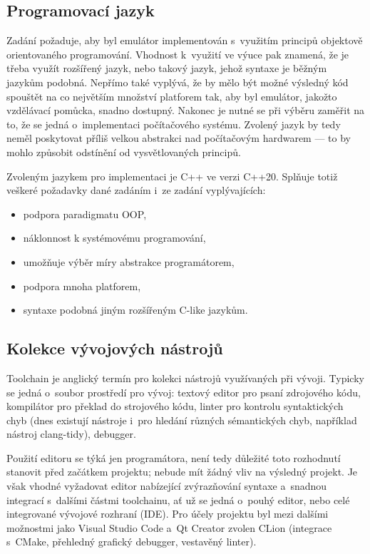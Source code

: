 \subsection{Programovací jazyk}
Zadání požaduje, aby byl emulátor implementován s~využitím principů objektově orientovaného programování. Vhodnost k~využití ve výuce pak znamená, že je třeba využít rozšířený jazyk, nebo takový jazyk, jehož syntaxe je běžným jazykům podobná. Nepřímo také vyplývá, že by mělo být možné výsledný kód spouštět na co největším množství platforem tak, aby byl emulátor, jakožto vzdělávací pomůcka, snadno dostupný. Nakonec je nutné se při výběru zaměřit na to, že se jedná o~implementaci počítačového systému. Zvolený jazyk by tedy neměl poskytovat příliš velkou abstrakci nad počítačovým hardwarem --- to by mohlo způsobit odstínění od vysvětlovaných principů.

Zvoleným jazykem pro implementaci je C++ ve verzi C++20. Splňuje totiž veškeré požadavky dané zadáním i~ze zadání vyplývajících:
\begin{itemize}
	\item podpora paradigmatu OOP,
	\item náklonnost k systémovému programování,
	\item umožňuje výběr míry abstrakce programátorem,
	\item podpora mnoha platforem,
	\item syntaxe podobná jiným rozšířeným C-like jazykům.
\end{itemize}

\subsection{Kolekce vývojových nástrojů}
\begin{definition}[Toolchain]
	Toolchain je anglický termín pro kolekci nástrojů využívaných při vývoji. Typicky se jedná o~soubor prostředí pro vývoj: textový editor pro psaní zdrojového kódu, kompilátor pro překlad do strojového kódu, linter pro kontrolu syntaktických chyb (dnes existují nástroje i~pro hledání různých sémantických chyb, například nástroj clang-tidy), debugger.
\end{definition}

Použití editoru se týká jen programátora, není tedy důležité toto rozhodnutí stanovit před začátkem projektu; nebude mít žádný vliv na výsledný projekt. Je však vhodné vyžadovat editor nabízející zvýrazňování syntaxe a~snadnou integrací s~dalšími částmi toolchainu, ať už se jedná o~pouhý editor, nebo celé integrované vývojové rozhraní (IDE). Pro účely projektu byl mezi dalšími možnostmi jako Visual Studio Code a~Qt Creator zvolen CLion (integrace s~CMake, přehledný grafický debugger, vestavěný linter).

